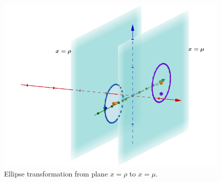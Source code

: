 \documentclass[a4paper,preprint,11pt]{article}
\begin{document}
\begin{figure}[h]
    \centering
    \includegraphics[scale=0.4]{Slow_Passage/3dEllipse_transformation.png}
    \caption{Ellipse transformation from plane $x=\rho$ to $x=\mu$.}
    \label{fig:ell.trans}
\end{figure}
\end{document}
